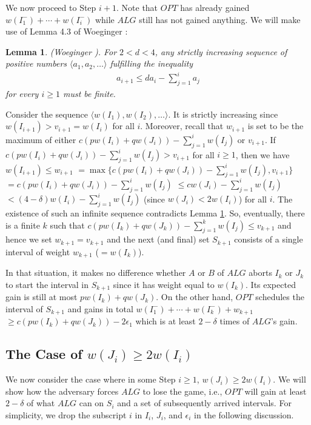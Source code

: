 \documentclass[11pt]{article}
\newtheorem{lemma}{Lemma}[section]
\begin{document}
We now proceed to Step $i+1$.
Note that $OPT$ has already gained
$w(I_1^-) + \cdots + w(I_i^-)$ while $ALG$ still has not gained anything.
We will make use of Lemma 4.3 of Woeginger \cite{Woeg94}:

\begin{lemma} \label{lem:woeg}
(Woeginger \cite{Woeg94}).
For $2<d<4$, any strictly increasing sequence of positive
numbers $\langle a_1, a_2, \ldots \rangle$ fulfilling
the inequality
  \begin{eqnarray*}
  a_{i+1} \leq d a_{i} - \sum_{j=1}^i a_j
  \end{eqnarray*}
for every $i \geq 1$ must be finite.
\end{lemma} 

Consider the sequence $\langle w(I_1), w(I_2), \ldots \rangle$.
It is strictly increasing since $w(I_{i+1}) > v_{i+1} = w(I_i)$ for all $i$.
Moreover, recall that $w_{i+1}$ is set to be the maximum of either
$c(p w(I_i) + q w(J_i)) - \sum_{j=1}^i w(I_j)$ or $v_{i+1}$.
If $c(p w(I_i) + q w(J_i)) - \sum_{j=1}^i w(I_j) > v_{i+1}$
for all $i \geq 1$,
then we have $w(I_{i+1}) \leq w_{i+1}$
$= \max \{ c(p w(I_i) + q w(J_i)) - \sum_{j=1}^i w(I_j), v_{i+1} \}$
$= c(p w(I_i) + q w(J_i)) - \sum_{j=1}^i w(I_j)$
$\leq c w(J_i) - \sum_{j=1}^i w(I_j)$
$< (4-\delta) w(I_i) - \sum_{j=1}^i w(I_j)$
(since $w(J_i) < 2w(I_i)$) for all $i$.
The existence of such an infinite sequence contradicts Lemma \ref{lem:woeg}.
So, eventually, there is a finite $k$ such that 
$c(p w(I_k) + q w(J_k)) - \sum_{j=1}^k w(I_j) \leq v_{k+1}$
and hence we set $w_{k+1} = v_{k+1}$ and the next (and final)
set $S_{k+1}$ consists of a single interval of weight $w_{k+1}$
($=w(I_k)$).

In that situation, it makes no difference whether $A$ or $B$ of $ALG$
aborts $I_k$ or $J_k$ to start the interval in $S_{k+1}$
since it has weight equal to $w(I_k)$.
Its expected gain is still at most $p w(I_k) + q w(J_k)$.
On the other hand, $OPT$ schedules the interval of $S_{k+1}$
and gains in total $w(I_1^-) + \cdots + w(I_{k}^-) + w_{k+1}$
$\geq c(p w(I_k) + q w(J_k)) - 2\epsilon_1$ which is
at least $2-\delta$ times of $ALG$'s gain.

\subsection{The Case of $w(J_i) \ge 2 w(I_i)$} 
  \label{subsec:ylarge}

We now consider the case where in some Step $i \ge 1$,
$w(J_i) \ge 2w(I_i)$.
We will show how the adversary forces $ALG$ to lose the game,
i.e., $OPT$ will gain at least $2-\delta$ of what $ALG$ can
on $S_i$ and a set of subsequently arrived intervals.
For simplicity, we drop the subscript $i$ in $I_i$, $J_i$, and
$\epsilon_i$ in the following discussion.
\end{document}
